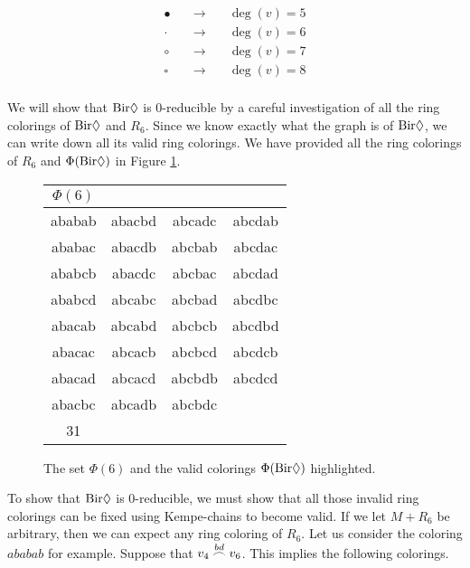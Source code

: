 \begin{equation*}
    \begin{matrix}
    \bullet &\quad \longrightarrow \quad &\deg(v)=5 \\
    \cdot &\quad \longrightarrow \quad & \deg(v)=6 \\
    \circ &\quad \longrightarrow \quad & \deg(v)=7 \\
    \square &\quad \longrightarrow \quad  & \deg(v)=8 \\
    \end{matrix}
\end{equation*}

We will show that $\bir$ is 0-reducible by a careful investigation of all the ring colorings of $\bir$ and $R_6$. Since we know exactly what the graph is of $\bir$, we can write down all its valid ring colorings. We have provided all the ring colorings of $R_6$ and $\Phi(\bir)$ in Figure \ref{table:colsring6}.

\needspace{4cm}
\begin{figure}[!ht]
    \centering
    \begin{tabular}{ cccc }
        $\Phi(6) $ & \\
        \hline
        ababab & abacbd & abcadc &  \cellcolor{g0} abcdab \\
        \cellcolor{g0} ababac &  \cellcolor{g0} abacdb &  \cellcolor{g0} abcbab & abcdac \\
        \cellcolor{g0} ababcb &  \cellcolor{g0} abacdc &  \cellcolor{g0} abcbac & abcdad \\
        ababcd & abcabc &  \cellcolor{g0} abcbad & abcdbc \\
        abacab & abcabd & abcbcb & abcdbd \\
        \cellcolor{g0} abacac &  \cellcolor{g0} abcacb &  \cellcolor{g0} abcbcd &  \cellcolor{g0} abcdcb \\
        abacad &  \cellcolor{g0} abcacd & abcbdb &  \cellcolor{g0} abcdcd \\
        \cellcolor{g0} abacbc &  \cellcolor{g0} abcadb & abcbdc \\
        \hline
        31 & \\
    \end{tabular}
    \caption{The set $\Phi(6)$ and the valid colorings $\Phi(\bir)$ highlighted. }
    \label{table:colsring6}
\end{figure}

To show that $\bir$ is 0-reducible, we must show that all those invalid ring colorings can be fixed using Kempe-chains to become valid. If we let $M+R_6$ be arbitrary, then we can expect any ring coloring of $R_6$. Let us consider the coloring $ababab$ for example. Suppose that $\chain{v_4}{v_6}{bd}$. This implies the following colorings.

